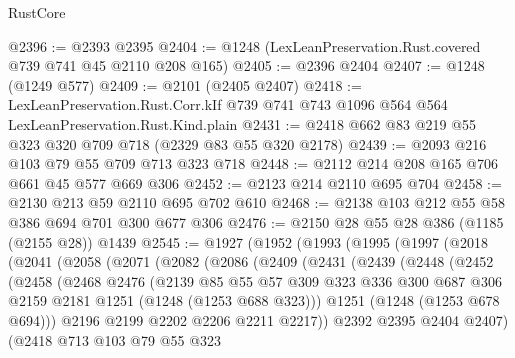 \begin{lexlean}{RustCore}
\begin{coremodule}
@2396 := @2393 @2395
@2404 := @1248 (LexLeanPreservation.Rust.covered @739 @741 @45 @2110 @208 @165)
@2405 := @2396 @2404
@2407 := @1248 (@1249 @577)
@2409 := @2101 (@2405 @2407)
@2418 := LexLeanPreservation.Rust.Corr.kIf
    @739
    @741
    @743
    @1096
    @564
    @564
    LexLeanPreservation.Rust.Kind.plain
@2431 := @2418 @662 @83 @219 @55 @323 @320 @709 @718 (@2329 @83 @55 @320 @2178)
@2439 := @2093 @216 @103 @79 @55 @709 @713 @323 @718
@2448 := @2112 @214 @208 @165 @706 @661 @45 @577 @669 @306
@2452 := @2123 @214 @2110 @695 @704
@2458 := @2130 @213 @59 @2110 @695 @702 @610
@2468 := @2138 @103 @212 @55 @58 @386 @694 @701 @300 @677 @306
@2476 := @2150 @28 @55 @28 @386 (@1185 (@2155 @28)) @1439
@2545 := @1927
    (@1952
      (@1993
        (@1995
          (@1997
            (@2018
              (@2041
                (@2058
                  (@2071
                    (@2082
                      (@2086
                        (@2409
                          (@2431
                            (@2439
                              (@2448
                                (@2452
                                  (@2458
                                    (@2468
                                      @2476
                                      (@2139
                                        @85
                                        @55
                                        @57
                                        @309
                                        @323
                                        @336
                                        @300
                                        @687
                                        @306
                                        @2159
                                        @2181
                                        @1251
                                        (@1248 (@1253 @688 @323)))
                                      @1251
                                      (@1248 (@1253 @678 @694)))
                                    @2196
                                    @2199
                                    @2202
                                    @2206
                                    @2211
                                    @2217))
                                @2392
                                @2395
                                @2404
                                @2407)
                              (@2418
                                @713
                                @103
                                @79
                                @55
                                @323

\end{coremodule}
\end{lexlean}
